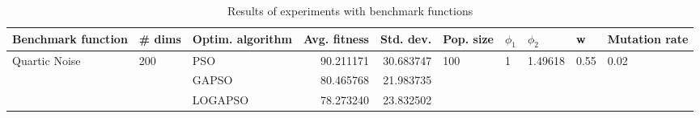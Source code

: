 \begin{table}
\centering
\caption{Results of experiments with benchmark functions}
\begin{tabular}{lllrrlllll}
\toprule
            Benchmark function &              \# dims & Optim. algorithm &  Avg. fitness &  Std. dev. &            Pop. size &         $\phi_{1}$ &               $\phi_{2}$ &                     w &         Mutation rate \\
\midrule
\multirow{3}{*}{Quartic Noise} & \multirow{3}{*}{200} &              PSO &     90.211171 &  30.683747 & \multirow{3}{*}{100} & \multirow{3}{*}{1} & \multirow{3}{*}{1.49618} & \multirow{3}{*}{0.55} & \multirow{3}{*}{0.02} \\
                               &                      &            GAPSO &     80.465768 &  21.983735 &                      &                    &                          &                       &                       \\
                               &                      &          LOGAPSO &     78.273240 &  23.832502 &                      &                    &                          &                       &                       \\
\bottomrule
\end{tabular}
\end{table}
